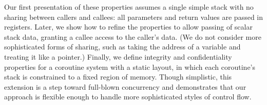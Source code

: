 \documentclass[acmsmall,review,anonymous]{acmart}\settopmatter{printfolios=true,printccs=false,printacmref=false}
\begin{document}

Our first presentation of these properties assumes a single simple stack
with no sharing between callers and callees: all parameters and return
values are passed in registers.  Later, we show how to refine the properties to allow
passing of scalar stack data, granting a callee access to the caller's
data. (We do not consider more sophisticated forms of sharing, such as
taking the address of a variable and treating it like a pointer.)
%
Finally, we define integrity and confidentiality properties for a coroutine
system with a static layout, in which each coroutine's stack is constrained
to a fixed region of memory.  Though simplistic, this extension is a step
toward full-blown concurrency and demonstrates that our approach is flexible
enough to handle more sophisticated styles of control flow.




\end{document}
